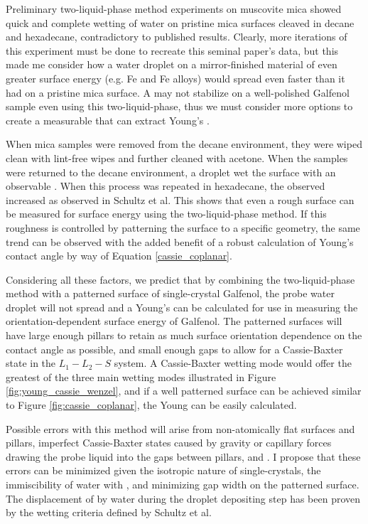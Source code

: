 Preliminary two-liquid-phase method experiments on muscovite mica showed quick and complete wetting of water on pristine mica surfaces cleaved in decane and hexadecane, contradictory to published results.\cite{Schultz1992} Clearly, more iterations of this experiment must be done to recreate this seminal paper's data, but this made me consider how a water droplet on a mirror-finished material of even greater surface energy (e.g. Fe and Fe alloys) would spread even faster than it had on a pristine mica surface. A \ca may not stabilize on a well-polished Galfenol sample even using this two-liquid-phase, thus we must consider more options to create a measurable \ca that can extract Young's \ca. 

When mica samples were removed from the decane environment, they were wiped clean with lint-free wipes and further cleaned with acetone. When the samples were returned to the decane environment, a droplet wet the surface with an observable \ca. When this process was repeated in hexadecane, the observed \ca increased as observed in Schultz et al. This shows that even a rough surface can be measured for surface energy using the two-liquid-phase method. If this roughness is controlled by patterning the surface to a specific geometry, the same trend can be observed with the added benefit of a robust calculation of Young's contact angle by way of Equation \ref{cassie_coplanar}. 

Considering all these factors, we predict that by combining the two-liquid-phase method with a patterned surface of single-crystal Galfenol, the probe water droplet will not spread and a Young's \ca can be calculated for use in measuring the orientation-dependent surface energy of Galfenol. The patterned surfaces will have large enough pillars to retain as much surface orientation dependence on the contact angle as possible, and small enough gaps to allow for a Cassie-Baxter state in the $ L_1-L_2-S $ system. A Cassie-Baxter wetting mode would offer the greatest \ca of the three main wetting modes illustrated in Figure \ref{fig:young_cassie_wenzel}, and if a well patterned surface can be achieved similar to Figure \ref{fig:cassie_coplanar}, the Young \ca can be easily calculated. 

Possible errors with this method will arise from non-atomically flat surfaces and pillars, imperfect Cassie-Baxter states caused by gravity or capillary forces drawing the probe liquid into the gaps between pillars, and . I propose that these errors can be minimized given the isotropic nature of single-crystals, the immiscibility of water with \nalk[s], and minimizing gap width on the patterned surface. 
The displacement of \nalk[s] by water during the droplet depositing step has been proven by the wetting criteria defined by Schultz et al.\cite{Schultz1992,Giljean2011}

